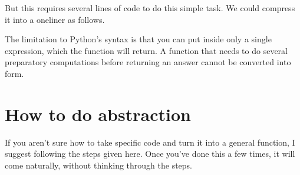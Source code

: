 \documentclass[letterpaper,10pt,english]{sphinxmanual}
\begin{document}
\begin{sphinxVerbatim}[commandchars=\\\{\}]
    
      \PYG{p}{[}     \PYG{p}{]}
     \PYG{p}{[}\PYG{p}{]}

\PYG{p}{[}\PYG{p}{]}  \PYG{p}{[}\PYG{p}{]}  
\end{sphinxVerbatim}

But this requires several lines of code to do this simple task.  We could compress it into a one\sphinxhyphen{}liner as follows.

\begin{sphinxVerbatim}[commandchars=\\\{\}]
\PYG{p}{[}\PYG{p}{]}  \PYG{p}{[}\PYG{p}{]}   \PYG{p}{[}\PYG{p}{]}\PYG{p}{[}\PYG{p}{]} 
\end{sphinxVerbatim}

The limitation to Python’s  syntax is that you can put inside only a single expression, which the function will return.  A function that needs to do several preparatory computations before returning an answer cannot be converted into  form.


\section{How to do abstraction}
\label{\detokenize{chapter-7-abstraction:how-to-do-abstraction}}
If you aren’t sure how to take specific code and turn it into a general function, I suggest following the steps given here.  Once you’ve done this a few times, it will come naturally, without thinking through the steps.
\end{document}
